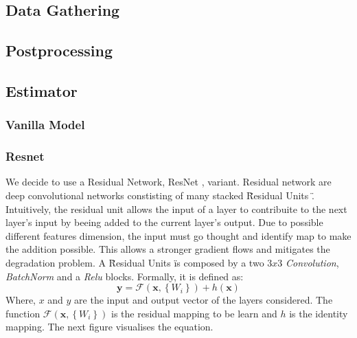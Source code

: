 \documentclass[../document.tex]{subfiles}
\begin{document}
\subsection{Data Gathering}
\subsection{Postprocessing}
\subsection{Estimator}

\subsubsection{Vanilla Model}
\subsubsection{Resnet}

We decide to use a Residual Network, ResNet \cite{he2015deep}, variant. Residual network are deep convolutional
networks constisting of many stacked \" Residual Units \". Intuitively, the residual unit allows the input of a layer to contribuite to the next layer's input by beeing added to the current layer's output. Due to possible different features dimension, the input must go thought and identify map to make the addition possible. This allows a stronger gradient flows and mitigates the degradation problem. A \"Residual Units \" is composed by a two $3x3$ \emph{Convolution}, \emph{BatchNorm} \cite{ioffe2015batch} and a \emph{Relu} blocks. Formally, it is defined as: 
\begin{equation}
	\mathbf{y}=\mathcal{F}\left(\mathbf{x},\left\{W_{i}\right\}\right)+h(\mathbf{x})
	\label{eq : resnet}
\end{equation}
Where, $x$ and $y$ are the input and output vector of the layers considered. The function $\mathcal{F}\left(\mathbf{x},\left\{W_{i}\right\}\right)$ is the residual mapping to be learn and $h$ is the identity mapping. The next figure visualises the equation.
\end{document}
